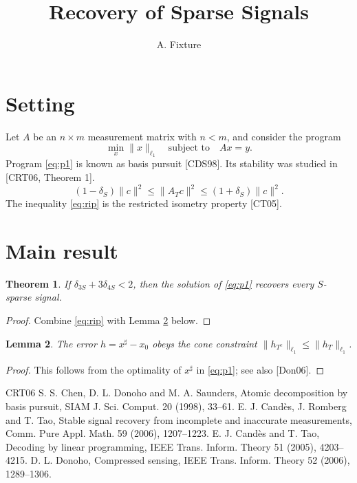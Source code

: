 \documentclass[leqno]{amsart}
\newtheorem{theorem}{Theorem}[section]
\newtheorem{lemma}[theorem]{Lemma}
\begin{document}
\title{Recovery of Sparse Signals}
\author{A. Fixture}
\maketitle
\section{Setting}
Let $A$ be an $n \times m$ measurement matrix with $n < m$, and consider the program
\begin{equation}\label{eq:p1}
\min_x \|x\|_{\ell_1} \quad \text{subject to} \quad Ax = y .
\end{equation}
Program \eqref{eq:p1} is known as basis pursuit [CDS98]. Its stability was studied in [CRT06, Theorem 1].
\begin{equation}\label{eq:rip}
(1-\delta_S)\|c\|^2 \le \|A_T c\|^2 \le (1+\delta_S)\|c\|^2 .
\end{equation}
The inequality \eqref{eq:rip} is the restricted isometry property [CT05].
\section{Main result}
\begin{theorem}\label{thm:main}
If $\delta_{3S} + 3\delta_{4S} < 2$, then the solution of \eqref{eq:p1} recovers every $S$-sparse signal.
\end{theorem}
\begin{proof}
Combine \eqref{eq:rip} with Lemma \ref{lem:cone} below.
\end{proof}
\begin{lemma}\label{lem:cone}
The error $h = x^\sharp - x_0$ obeys the cone constraint $\|h_{T^c}\|_{\ell_1} \le \|h_T\|_{\ell_1}$.
\end{lemma}
\begin{proof}
This follows from the optimality of $x^\sharp$ in \eqref{eq:p1}; see also [Don06].
\end{proof}
\begin{thebibliography}{CRT06}
 S. S. Chen, D. L. Donoho and M. A. Saunders, Atomic decomposition by basis pursuit, SIAM J. Sci. Comput. 20 (1998), 33--61.
 E. J. Cand\`es, J. Romberg and T. Tao, Stable signal recovery from incomplete and inaccurate measurements, Comm. Pure Appl. Math. 59 (2006), 1207--1223.
 E. J. Cand\`es and T. Tao, Decoding by linear programming, IEEE Trans. Inform. Theory 51 (2005), 4203--4215.
 D. L. Donoho, Compressed sensing, IEEE Trans. Inform. Theory 52 (2006), 1289--1306.
\end{thebibliography}
\end{document}
